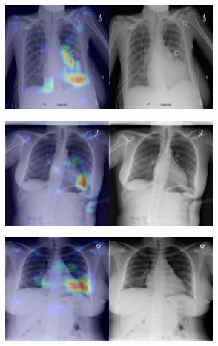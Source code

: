 \begin{figure}[b]
\begin{subfigure}{0.4\textwidth}
    \end{subfigure}
    \begin{subfigure}{0.4\textwidth}
        \centering
        \includegraphics[width=1.0\textwidth]{Chapters/5. Conclusiones/img/Cardiomegaly/1_0_00004344_045.png}
    \end{subfigure}
    \begin{subfigure}{0.4\textwidth}
        \centering
        \includegraphics[width=1.0\textwidth]{Chapters/5. Conclusiones/img/Cardiomegaly/1_0_00004526_017.png}
    \end{subfigure}
    \begin{subfigure}{0.4\textwidth}
        \centering
        \includegraphics[width=1.0\textwidth]{Chapters/5. Conclusiones/img/Cardiomegaly/1_1_00014706_010.png}

\end{subfigure}
\end{figure}
